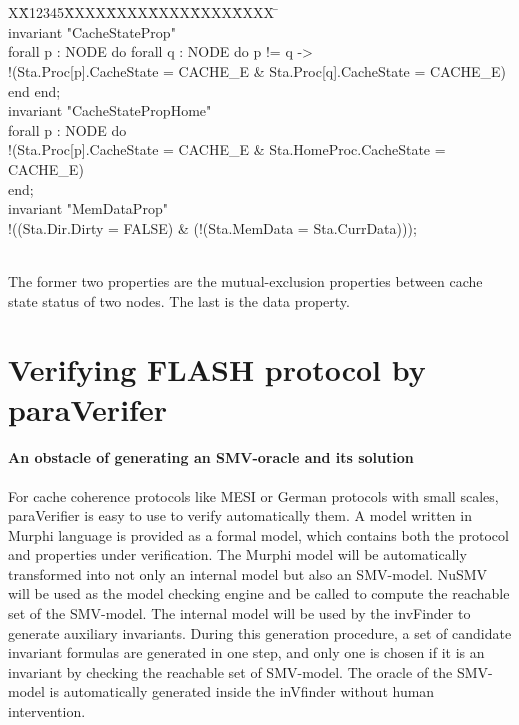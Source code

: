 \documentclass{llncs}
\newlength{\fminilength}
\newenvironment{fmini}[1][\linewidth]
  {\setlength{\fminilength}{#1\fboxsep-2\fboxrule}%
   \vspace{2ex}\noindent\begin{lrbox}{\fminibox}\begin{minipage}{\fminilength}%
   \mbox{ }\hfill\vspace{-2.5ex}}%
  {\end{minipage}\end{lrbox}\vspace{1ex}\hspace{0ex}%
   \framebox{\usebox{\fminibox}}}
\newenvironment{specification}
{\noindent\scriptsize
\tt\begin{fmini}\begin{tabbing}X\=X12345\=XXXX\=XXXX\=XXXX\=XXXX\=XXXX
\=\+\kill} {\end{tabbing}\normalfont\end{fmini}}
\newcommand{\bedt}[1]{{\color{black}#1}}
\begin{document}
\begin{specification}\\
invariant "CacheStateProp"\\
  forall p : NODE do forall q : NODE do     p != q ->\\
    !(Sta.Proc[p].CacheState = CACHE\_E \& Sta.Proc[q].CacheState = CACHE\_E)\\
  end end;\\

invariant "CacheStatePropHome"\\
  forall p : NODE do\\
    !(Sta.Proc[p].CacheState = CACHE\_E \& Sta.HomeProc.CacheState = CACHE\_E)\\
  end;\\

invariant "MemDataProp"\\
  !((Sta.Dir.Dirty = FALSE) \& (!(Sta.MemData = Sta.CurrData)));\\
\end{specification}\\

The former two properties are the mutual-exclusion properties between  cache state status of two nodes. The last is the  data property.

\section{Verifying FLASH protocol by {\sf paraVerifer} \label{sec:experiments}}
\paragraph{An obstacle of generating an SMV-oracle and its solution}
For cache coherence protocols like MESI or German protocols with small scales,   {\sf paraVerifier}  is easy to use to verify automatically them. \bedt{A model written in Murphi language} is provided as a formal model, which contains both the protocol and properties under verification. The Murphi model will be automatically transformed into not only an internal model but also an SMV-model. NuSMV will \bedt{be used as the model checking engine} and be called to compute the reachable set of the SMV-model. The internal model will be used by the {\sf invFinder} to generate auxiliary invariants. During this generation procedure, a set of candidate invariant formulas are generated in one step, and only one is chosen  if it is an invariant by checking the reachable set of   SMV-model. The oracle of the SMV-model is automatically generated inside the {\sf inVfinder} without human intervention.
\end{document}
